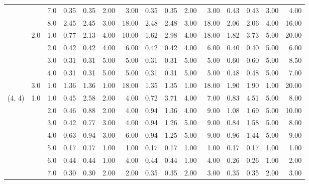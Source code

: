 \begin{tabular}{lllrrrrrrrrrrrr}
       &     & 7.0  &       0.35 &      0.35 & 2.00 &   3.00 &       0.35 &      0.35 &  2.00 &   3.00 &       0.43 &      0.43 &  3.00 &   4.00 \\
       &     & 8.0  &       2.45 &      2.45 & 3.00 &  18.00 &       2.48 &      2.48 &  3.00 &  18.00 &       2.06 &      2.06 &  4.00 &  16.00 \\
       & 2.0 & 1.0  &       0.77 &      2.13 & 4.00 &  10.00 &       1.62 &      2.98 &  4.00 &  18.00 &       1.82 &      3.73 &  5.00 &  20.00 \\
       &     & 2.0  &       0.42 &      0.42 & 4.00 &   6.00 &       0.42 &      0.42 &  4.00 &   6.00 &       0.40 &      0.40 &  5.00 &   6.00 \\
       &     & 3.0  &       0.31 &      0.31 & 5.00 &   5.00 &       0.31 &      0.31 &  5.00 &   5.00 &       0.60 &      0.60 &  5.00 &   8.50 \\
       &     & 4.0  &       0.31 &      0.31 & 5.00 &   5.00 &       0.31 &      0.31 &  5.00 &   5.00 &       0.48 &      0.48 &  5.00 &   7.00 \\
       & 3.0 & 1.0  &       1.36 &      1.36 & 1.00 &  18.00 &       1.35 &      1.35 &  1.00 &  18.00 &       1.90 &      1.90 &  1.00 &  20.00 \\
(4, 4) & 1.0 & 1.0  &       0.45 &      2.58 & 2.00 &   4.00 &       0.72 &      3.71 &  4.00 &   7.00 &       0.83 &      4.51 &  5.00 &   8.00 \\
       &     & 2.0  &       0.46 &      0.88 & 2.00 &   4.00 &       0.94 &      1.36 &  4.00 &   9.00 &       1.08 &      1.69 &  5.00 &  10.00 \\
       &     & 3.0  &       0.42 &      0.77 & 3.00 &   4.00 &       0.94 &      1.26 &  5.00 &   9.00 &       0.84 &      1.58 &  5.00 &   8.00 \\
       &     & 4.0  &       0.63 &      0.94 & 3.00 &   6.00 &       0.94 &      1.25 &  5.00 &   9.00 &       0.96 &      1.44 &  5.00 &   9.00 \\
       &     & 5.0  &       0.17 &      0.17 & 1.00 &   1.00 &       0.17 &      0.17 &  1.00 &   1.00 &       0.17 &      0.17 &  1.00 &   1.00 \\
       &     & 6.0  &       0.44 &      0.44 & 1.00 &   4.00 &       0.44 &      0.44 &  1.00 &   4.00 &       0.26 &      0.26 &  1.00 &   2.00 \\
       &     & 7.0  &       0.30 &      0.30 & 2.00 &   2.00 &       0.35 &      0.35 &  2.00 &   3.00 &       0.35 &      0.35 &  2.00 &   3.00 \\

\end{tabular}
